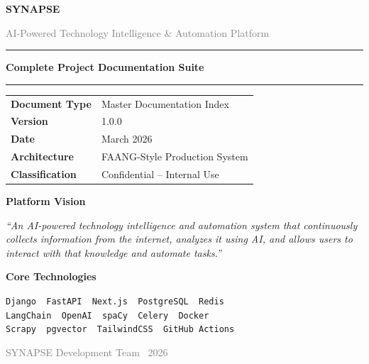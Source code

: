 \documentclass[12pt,a4paper]{report}
\begin{document}
\begin{titlepage}
    \centering
    \vspace*{2cm}
    {\Huge\bfseries\textcolor{synapseblue}{SYNAPSE}\par}
    \vspace{0.5cm}
    {\large\textcolor{gray}{AI-Powered Technology Intelligence \& Automation Platform}\par}
    \vspace{1cm}
    \rule{\linewidth}{2pt}
    \vspace{0.5cm}
    {\LARGE\bfseries Complete Project Documentation Suite\par}
    \vspace{0.5cm}
    \rule{\linewidth}{2pt}
    \vspace{2cm}
    \begin{tabular}{ll}
        \toprule
        \textbf{Document Type}    & Master Documentation Index \\
        \textbf{Version}          & 1.0.0 \\
        \textbf{Date}             & March 2026 \\
        \textbf{Architecture}     & FAANG-Style Production System \\
        \textbf{Classification}   & Confidential -- Internal Use \\
        \bottomrule
    \end{tabular}
    \vspace{2cm}

    {\large\textbf{Platform Vision}\par}
    \vspace{0.3cm}
    \begin{minipage}{0.8\linewidth}
    \centering\itshape
    ``An AI-powered technology intelligence and automation system that continuously
    collects information from the internet, analyzes it using AI, and allows users
    to interact with that knowledge and automate tasks.''
    \end{minipage}

    \vspace{2cm}
    {\large\textbf{Core Technologies}\par}
    \vspace{0.3cm}
    \texttt{Django \textbullet\ FastAPI \textbullet\ Next.js \textbullet\ PostgreSQL \textbullet\ Redis}\\[4pt]
    \texttt{LangChain \textbullet\ OpenAI \textbullet\ spaCy \textbullet\ Celery \textbullet\ Docker}\\[4pt]
    \texttt{Scrapy \textbullet\ pgvector \textbullet\ TailwindCSS \textbullet\ GitHub Actions}
    \vfill
    {\small\textcolor{gray}{SYNAPSE Development Team \textbullet\ 2026}\par}
\end{titlepage}
\end{document}
